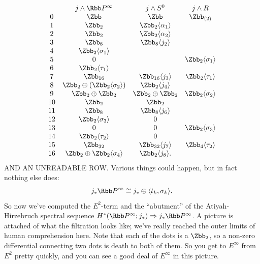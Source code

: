 \[
\begin{array}{cccc}
& j \sprod \RP^\infty & j \sprod S^0 & j \sprod R \\
0 & \Zbb & \Zbb & \Zbb_{(2)} \\
1 & \Zbb_2 & \Zbb_2 \langle \alpha_1 \rangle \\
2 & \Zbb_2 & \Zbb_2 \langle \alpha_2 \rangle \\
3 & \Zbb_8 & \Zbb_8 \langle j_2 \rangle \\
4 & \Zbb_2 \langle \sigma_1 \rangle \\
5 & 0 & & \Zbb_2 \langle \sigma_1 \rangle \\
6 & \Zbb_2 \langle \tau_1 \rangle \\
7 & \Zbb_{16} & \Zbb_{16} \langle j_3 \rangle & \Zbb_2 \langle \tau_1 \rangle \\
8 & \Zbb_2 \oplus (\Zbb_2 \langle \sigma_2 \rangle) & \Zbb_2 \langle j_4 \rangle \\
9 & \Zbb_2 \oplus \Zbb_2 & \Zbb_2 \oplus \Zbb_2 & \Zbb_2 \langle \sigma_2 \rangle \\
10 & \Zbb_2 & \Zbb_2 \\
11 & \Zbb_8 & \Zbb_8 \langle j_6 \rangle \\
12 & \Zbb_2 \langle \sigma_3 \rangle & 0 \\
13 & 0 & 0 & \Zbb_2 \langle \sigma_3 \rangle \\
14 & \Zbb_2 \langle \tau_2 \rangle  & 0 \\
15 & \Zbb_{32} & \Zbb_{32} \langle j_7 \rangle & \Zbb_4 \langle \tau_2 \rangle \\
16 & \Zbb_2 \oplus \Zbb_2 \langle \sigma_4 \rangle & \Zbb_2 \langle j_8 \rangle.
\end{array}
\]
AND AN UNREADABLE ROW.  Various things could happen, but in fact nothing else does:
\[
j_* \RP^\infty \cong j_* \oplus \langle t_k, \sigma_k \rangle.
\]
So now we've computed the $E^2$-term and the ``abutment'' of the Atiyah-Hirzebruch spectral sequence $H^*(\RP^\infty; j_*) \Rightarrow j_* \RP^\infty$.  A picture is attached of what the filtration looks like; we've really reached the outer limits of human comprehension here.  Note that each of the dots is a $\Zbb_2$, so a non-zero differential connecting two dots is death to both of them.  So you get to $E^\infty$ from $E^2$ pretty quickly, and you can see a good deal of $E^\infty$ in this picture.


